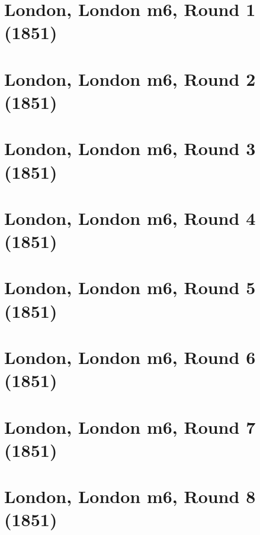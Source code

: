 \documentclass[11pt]{article}
\newcommand*\cleartoleftpage{%
   \clearpage
   \ifodd\value{page}\hbox{}\newpage\fi
}
\begin{document}
\cleartoleftpage

\section{London, London m6, Round 1 (1851)}


\cleartoleftpage

\section{London, London m6, Round 2 (1851)}


\cleartoleftpage

\section{London, London m6, Round 3 (1851)}


\cleartoleftpage

\section{London, London m6, Round 4 (1851)}


\cleartoleftpage

\section{London, London m6, Round 5 (1851)}


\cleartoleftpage

\section{London, London m6, Round 6 (1851)}


\cleartoleftpage

\section{London, London m6, Round 7 (1851)}


\cleartoleftpage

\section{London, London m6, Round 8 (1851)}

\end{document}
